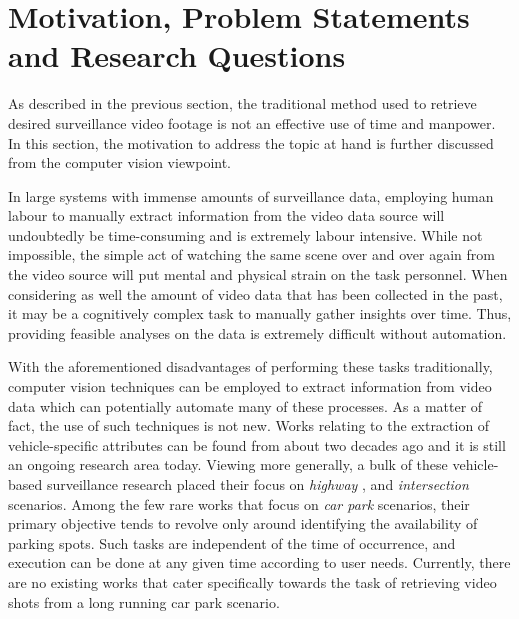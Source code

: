 \section{Motivation, Problem Statements and Research Questions}

As described in the previous section, the traditional method used to retrieve desired surveillance video footage is not an effective use of time and manpower. In this section, the motivation to address the topic at hand is further discussed from the computer vision viewpoint.%


In large systems with immense amounts of surveillance data, employing human labour to manually extract information from the video data source will undoubtedly be time-consuming and is extremely labour intensive.
While not impossible, the simple act of watching the same scene over and over again from the video source will put mental and physical strain on the task personnel. When considering as well the amount of video data that has been collected in the past, it may be a cognitively complex task to manually gather insights over time. Thus, providing feasible analyses on the data is extremely difficult without automation.

With the aforementioned disadvantages of performing these tasks traditionally, computer vision techniques can be employed to extract information from video data which can potentially automate many of these processes. As a matter of fact, the use of such techniques is not new. %
Works relating to the extraction of vehicle-specific attributes can be found from about two decades ago and it is still an ongoing research area today. Viewing more generally, a bulk of these vehicle-based surveillance research placed their focus on \textit{highway} \cite{yu2017improved, cao2016vehicle, arya2016real, liu2016highway, al2016adaptive}, and  \textit{intersection} \cite{meng2017traffic, choong2017modeling, ren2018learning} scenarios. Among the few rare works \cite{shi2017study, marmol2016quickspot, ling2017identifying} that focus on \emph{car park} scenarios, their primary objective tends to revolve only around identifying the availability of parking spots. Such tasks are independent of the time of occurrence, and execution can be done at any given time according to user needs. Currently, there are no existing works that cater specifically towards the task of retrieving video shots from a long running car park scenario.

